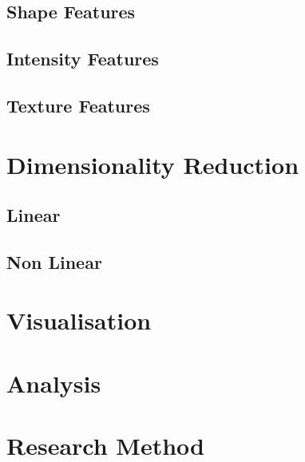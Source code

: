 \subsection{Shape Features}
\subsection{Intensity Features}
\subsection{Texture Features}

\section{Dimensionality Reduction}

\subsection{Linear}
\subsection{Non Linear}

\section{Visualisation}

\section{Analysis}

\section{Research Method}
